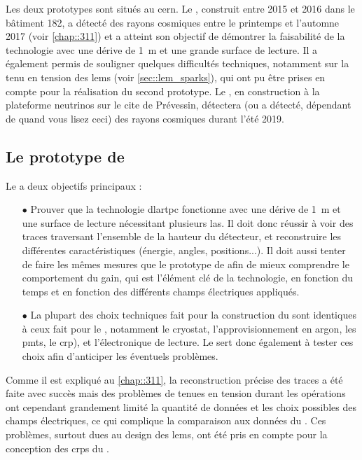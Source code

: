     Les deux prototypes sont situés au \gls{cern}. Le \TOO{}, construit entre 2015 et 2016 dans le bâtiment 182, a détecté des rayons cosmiques entre le printemps et l'automne 2017 (voir \autoref{chap::311}) et a atteint son objectif de démontrer la faisabilité de la technologie avec une dérive de \SI{1}{\meter} et une grande surface de lecture. Il a également permis de souligner quelques difficultés techniques, notamment sur la tenu en tension des \glspl{lem} (voir \autoref{sec::lem_sparks}), qui ont pu être prises en compte pour la réalisation du second prototype.  Le \SSS{}, en construction à la plateforme neutrinos sur le cite de Prévessin, détectera (ou a détecté, dépendant de quand vous lisez ceci) des rayons cosmiques durant l'été 2019.

    \subsection{Le prototype de \TOO{}}

      Le \TOO{} a deux objectifs principaux :
      \begin{itemize}
        \item[$\bullet$] Prouver que la technologie \gls{dlartpc} fonctionne avec une dérive de \SI{1}{\meter} et une surface de lecture nécessitant plusieurs \gls{las}. Il doit donc réussir à voir des traces traversant l'ensemble de la hauteur du détecteur, et reconstruire les différentes caractéristiques (énergie, angles, positions...). Il doit aussi tenter de faire les mêmes mesures que le  prototype de \threeL{} afin de mieux comprendre le comportement du gain, qui est l'élément clé de la technologie, en fonction du temps et en fonction des différents champs électriques appliqués.
        \item[$\bullet$] La plupart des choix techniques fait pour la construction du \TOO{} sont identiques à ceux fait pour le \SSS{}, notamment le cryostat, l'approvisionnement en argon, les \glspl{pmt}, le \gls{crp}), et l'électronique de lecture. Le \TOO{} sert donc également à tester ces choix afin d'anticiper les éventuels problèmes.
      \end{itemize}
      Comme il est expliqué au \autoref{chap::311}, la reconstruction précise des traces a été faite avec succès mais des problèmes de tenues en tension durant les opérations ont cependant grandement limité la quantité de données et les choix possibles des champs électriques, ce qui complique la comparaison aux données du \threeL{}. Ces problèmes, surtout dues au design des \glspl{lem}, ont été pris en compte pour la conception des \glspl{crp} du \SSS{}.

